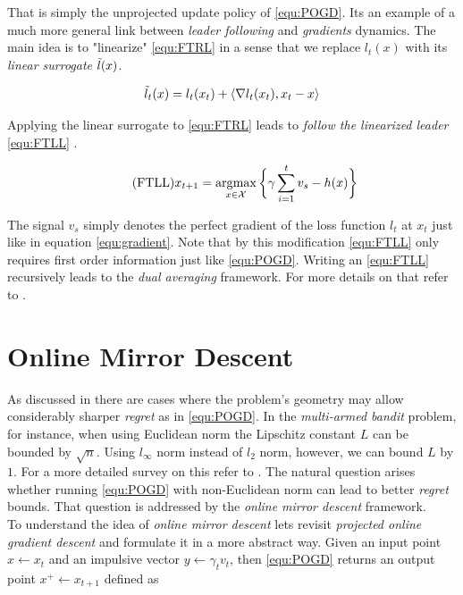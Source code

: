 That is simply the unprojected update policy of \ref{equ:POGD}. Its an example of a much more general link between \textit{leader following} and \textit{gradients} dynamics. The main idea is to "linearize" \ref{equ:FTRL} in a sense that we replace $l_t(x)$ with its \textit{linear surrogate} $\Tilde{l}(x)$.

\begin{equation*}
    \Tilde{l}_t(x) = l_t(x_t) + \langle \nabla l_t(x_t),x_t-x \rangle
\end{equation*}

Applying the linear surrogate to \ref{equ:FTRL} leads to \textit{follow the linearized leader} \ref{equ:FTLL} \cite{HDRmertikopoulos}. 

\begin{equation}
    \tag{FTLL}
    x_{t+1} = \operatorname*{\arg\!\max}_{x \in \mathcal{X}} \bigg\{\gamma\sum_{i=1}^t v_s - h(x)\bigg\}
    \label{equ:FTLL}
\end{equation}

The signal $v_s$ simply denotes the perfect gradient of the loss function $l_t$ at $x_t$ just like in equation \ref{equ:gradient}. Note that by this modification \ref{equ:FTLL} only requires first order information just like \ref{equ:POGD}. Writing an \ref{equ:FTLL} recursively leads to the \textit{dual averaging} framework. For more details on that refer to \cite{HDRmertikopoulos, mertikopoulos}.


\section{Online Mirror Descent}\label{section:OnlineMirrorDescent}

As discussed in \cite{shalev, HDRmertikopoulos} there are cases where the problem's geometry may allow considerably sharper \textit{regret} as in \ref{equ:POGD}. In the \textit{multi-armed bandit} problem, for instance, when using Euclidean norm the Lipschitz constant $L$ can be bounded by $\sqrt{n}$. Using $l_\infty$ norm instead of $l_2$ norm, however, we can bound $L$ by $1$. For a more detailed survey on this refer to \cite{shalev, HDRmertikopoulos}. The natural question arises whether running \ref{equ:POGD} with non-Euclidean norm can lead to better \textit{regret} bounds. That question is addressed by the \textit{online mirror descent} framework. \\

To understand the idea of \textit{online mirror descent} lets revisit \textit{projected online gradient descent} and formulate it in a more abstract way. Given an input point $x \gets x_t$ and an impulsive vector $y \gets \gamma_t v_t$, then \ref{equ:POGD} returns an output point $x^+ \gets x_{t+1}$ defined as


